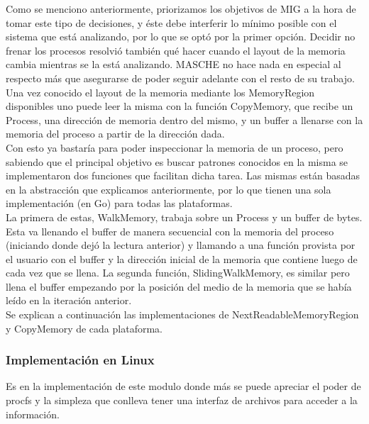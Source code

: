\noindent Como se menciono anteriormente, priorizamos los objetivos de MIG a la
hora de tomar este tipo de decisiones, y éste debe interferir lo mínimo posible
con el sistema que está analizando, por lo que se optó por la primer opción.
Decidir no frenar los procesos resolvió también qué hacer cuando el layout de
la memoria cambia mientras se la está analizando. MASCHE no hace nada en
especial al respecto más que asegurarse de poder seguir adelante con el resto
de su trabajo.\\

Una vez conocido el layout de la memoria mediante los MemoryRegion disponibles
uno puede leer la misma con la función CopyMemory, que recibe un Process, una
dirección de memoria dentro del mismo, y un buffer a llenarse con la memoria
del proceso a partir de la dirección dada.\\

Con esto ya bastaría para poder inspeccionar la memoria de un proceso, pero
sabiendo que el principal objetivo es buscar patrones conocidos en la misma
se implementaron dos funciones que facilitan dicha tarea. Las mismas están
basadas en la abstracción que explicamos anteriormente, por lo que tienen una sola
implementación (en Go) para todas las plataformas.\\

La primera de estas, WalkMemory, trabaja sobre un Process y un buffer de bytes.
Esta va llenando el buffer de manera secuencial con la memoria del proceso
(iniciando donde dejó la lectura anterior) y llamando a una función provista
por el usuario con el buffer y la dirección inicial de la memoria que contiene
luego de cada vez que se llena. La segunda función, SlidingWalkMemory, es
similar pero llena el buffer empezando por la posición del medio de la memoria
que se había leído en la iteración anterior.\\

Se explican a continuación las implementaciones de NextReadableMemoryRegion y
CopyMemory de cada plataforma.\\

\subsubsection{Implementación en Linux}

Es en la implementación de este modulo donde más se puede apreciar el poder de
procfs y la simpleza que conlleva tener una interfaz de archivos para acceder a
la información.\\


